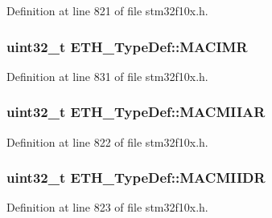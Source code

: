 Definition at line 821 of file stm32f10x.\+h.

\subsubsection[{\texorpdfstring{M\+A\+C\+I\+MR}{MACIMR}}]{ {\bf uint32\+\_\+t} E\+T\+H\+\_\+\+Type\+Def\+::\+M\+A\+C\+I\+MR}\hypertarget{struct_e_t_h___type_def_a45d413bc59caf6c14eb230266d7ab8c3}{}\label{struct_e_t_h___type_def_a45d413bc59caf6c14eb230266d7ab8c3}


Definition at line 831 of file stm32f10x.\+h.

\subsubsection[{\texorpdfstring{M\+A\+C\+M\+I\+I\+AR}{MACMIIAR}}]{ {\bf uint32\+\_\+t} E\+T\+H\+\_\+\+Type\+Def\+::\+M\+A\+C\+M\+I\+I\+AR}\hypertarget{struct_e_t_h___type_def_af697fcc940139f7dcb483766420852be}{}\label{struct_e_t_h___type_def_af697fcc940139f7dcb483766420852be}


Definition at line 822 of file stm32f10x.\+h.

\subsubsection[{\texorpdfstring{M\+A\+C\+M\+I\+I\+DR}{MACMIIDR}}]{ {\bf uint32\+\_\+t} E\+T\+H\+\_\+\+Type\+Def\+::\+M\+A\+C\+M\+I\+I\+DR}\hypertarget{struct_e_t_h___type_def_a3d4c60bb689285b937c939b36a1233a3}{}\label{struct_e_t_h___type_def_a3d4c60bb689285b937c939b36a1233a3}


Definition at line 823 of file stm32f10x.\+h.

